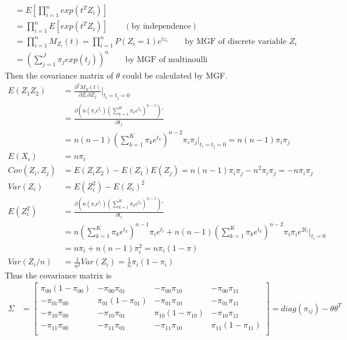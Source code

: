 \begin{itemize}
\begin{align*}
		&= E[\prod_{i=1}^n exp(t^TZ_i)]\\
		&= \prod_{i=1}^n E[exp(t^TZ_i)]  \qquad (\text{by independence})\\
		&= \prod_{i=1}^n M_{Z_i}(t) = \prod_{i=1}^n P(Z_i= 1) e^{tz_i}\qquad  \text{by MGF of discrete variable $Z_i$}\\
		&= \left( \sum_{j=1}^J \pi_j exp(t_j)\right)^n \qquad \text{by MGF of multinoulli}
	\end{align*}  
	Then the covariance matrix of $\theta$ could be calculated by MGF.
	\begin{align*}
		E(Z_1 Z_2) &= \frac{\partial^2 M_Z(t)}{\partial Z_i \partial Z_j}|_{t_i = t_j = 0}\\
		&= \frac{\partial \left(n(\pi_ie^{t_i})(\sum_{k=1}^K \pi_ke^{t_k})^{n-1} \right)'}{\partial t_j}\\
		&= n(n-1)(\sum_{k=1}^K \pi_ke^{t_k})^{n-2}\pi_i\pi_j|_{t_i = t_j = 0} = n(n-1)\pi_i\pi_j\\
		E(X_i) &= n\pi_i\\
		Cov(Z_i, Z_j) &= E(Z_i Z_2) - E(Z_1)E(Z_j) = n(n-1)\pi_i\pi_j - n^2 \pi_i\pi_j = -n\pi_i\pi_j\\
		Var(Z_i) &= E(Z_i^2) - E(Z_i)^2 \\
		E(Z_i^2) &=  \frac{\partial \left(n(\pi_ie^{t_i})(\sum_{k=1}^K \pi_ke^{t_k})^{n-1} \right)'}{\partial t_i}\\
		&= n(\sum_{k=1}^K \pi_ke^{t_k})^{n-1}\pi_i e^{t_i}+ n(n-1)(\sum_{k=1}^K \pi_ke^{t_k})^{n-2}\pi_i\pi_i e^{2t_i}|_{t_i = 0} \\
		&= n\pi_i + n(n-1)\pi_i^2 = n\pi_i(1-\pi)\\
		Var(Z_i/n) &= \frac{1}{n^2} Var(Z_i) = \frac{1}{n}\pi_i(1-\pi_i)
	\end{align*}
	Thus the covariance matrix is
	\begin{align*}
		\Sigma &= \begin{bmatrix}
			\pi_{00}(1-\pi_{00}) &  -\pi_{00}\pi_{01}&  -\pi_{00}\pi_{10} &  -\pi_{00}\pi_{11}\\
			-\pi_{01}\pi_{00} & \pi_{01}(1-\pi_{01}) & -\pi_{01}\pi_{10}   & -\pi_{01}\pi_{11}  \\
			-\pi_{10}\pi_{00} & -\pi_{10}\pi_{01} &  \pi_{10}(1-\pi_{10})  & -\pi_{10}\pi_{11}  \\
			-\pi_{11}\pi_{00} &  -\pi_{11}\pi_{01} & -\pi_{11}\pi_{10}   & \pi_{11}(1-\pi_{11})  \\
		\end{bmatrix}= diag{(\pi_{ij}) - \theta \theta^T}
	\end{align*}

\end{itemize}
